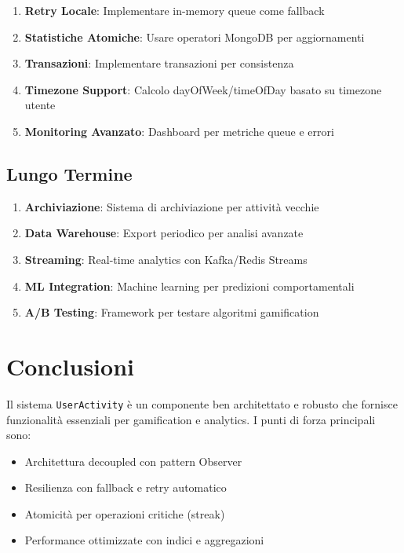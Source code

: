 \documentclass[11pt,a4paper]{article}
\begin{document}
\begin{enumerate}
    \item \textbf{Retry Locale}: Implementare in-memory queue come fallback
    \item \textbf{Statistiche Atomiche}: Usare operatori MongoDB per aggiornamenti
    \item \textbf{Transazioni}: Implementare transazioni per consistenza
    \item \textbf{Timezone Support}: Calcolo dayOfWeek/timeOfDay basato su timezone utente
    \item \textbf{Monitoring Avanzato}: Dashboard per metriche queue e errori
\end{enumerate}

\subsection{Lungo Termine}

\begin{enumerate}
    \item \textbf{Archiviazione}: Sistema di archiviazione per attività vecchie
    \item \textbf{Data Warehouse}: Export periodico per analisi avanzate
    \item \textbf{Streaming}: Real-time analytics con Kafka/Redis Streams
    \item \textbf{ML Integration}: Machine learning per predizioni comportamentali
    \item \textbf{A/B Testing}: Framework per testare algoritmi gamification
\end{enumerate}

\section{Conclusioni}

Il sistema \texttt{UserActivity} è un componente ben architettato e robusto che fornisce funzionalità essenziali per gamification e analytics. I punti di forza principali sono:

\begin{itemize}
    \item Architettura decoupled con pattern Observer
    \item Resilienza con fallback e retry automatico
    \item Atomicità per operazioni critiche (streak)
    \item Performance ottimizzate con indici e aggregazioni
\end{itemize}
\end{document}
